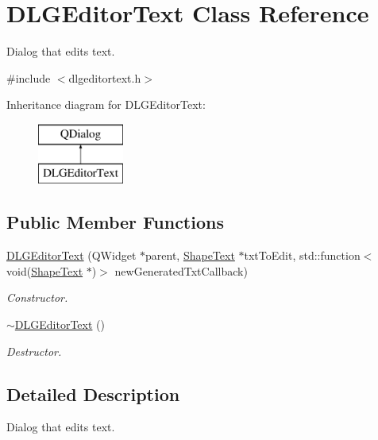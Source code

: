\hypertarget{class_d_l_g_editor_text}{}\section{D\+L\+G\+Editor\+Text Class Reference}
\label{class_d_l_g_editor_text}


Dialog that edits text.  




{\ttfamily \#include $<$dlgeditortext.\+h$>$}

Inheritance diagram for D\+L\+G\+Editor\+Text\+:\begin{figure}[H]
\begin{center}
\leavevmode
\includegraphics[height=2.000000cm]{class_d_l_g_editor_text}
\end{center}
\end{figure}
\subsection*{Public Member Functions}
\begin{DoxyCompactItemize}
\item 
\mbox{\hyperlink{class_d_l_g_editor_text_a494bd6724e03866041223691060fc309}{D\+L\+G\+Editor\+Text}} (Q\+Widget $\ast$parent, \mbox{\hyperlink{class_shape_text}{Shape\+Text}} $\ast$txt\+To\+Edit, std\+::function$<$ void(\mbox{\hyperlink{class_shape_text}{Shape\+Text}} $\ast$)$>$ new\+Generated\+Txt\+Callback)
\begin{DoxyCompactList}\small\item\em Constructor. \end{DoxyCompactList}\item 
\mbox{\hyperlink{class_d_l_g_editor_text_ab4b97eba149c341f29202b7deb62a567}{$\sim$\+D\+L\+G\+Editor\+Text}} ()
\begin{DoxyCompactList}\small\item\em Destructor. \end{DoxyCompactList}\end{DoxyCompactItemize}


\subsection{Detailed Description}
Dialog that edits text. 



